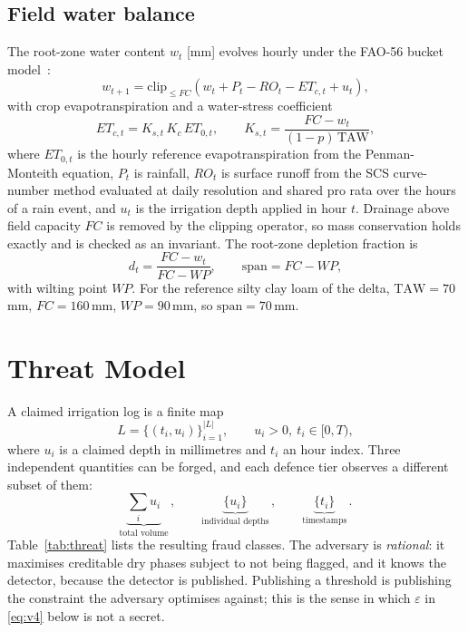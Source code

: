 \documentclass[journal]{IEEEtran}
\begin{document}
\subsection{Field water balance}

The root-zone water content $w_t$ [mm] evolves hourly under the FAO-56 bucket
model~\cite{fao56}:
\begin{equation}
w_{t+1}=\mathrm{clip}_{\le FC}\!\left(w_t+P_t-RO_t-ET_{c,t}+u_t\right),
\label{eq:bucket}
\end{equation}
with crop evapotranspiration and a water-stress coefficient
\begin{equation}
ET_{c,t}=K_{s,t}\,K_c\,ET_{0,t},
\qquad
K_{s,t}=\frac{FC-w_t}{(1-p)\,\mathrm{TAW}},
\label{eq:etc}
\end{equation}
where $ET_{0,t}$ is the hourly reference evapotranspiration from the
Penman-Monteith equation, $P_t$ is rainfall, $RO_t$ is surface runoff from the
SCS curve-number method evaluated at daily resolution and shared pro rata over
the hours of a rain event, and $u_t$ is the irrigation depth applied in hour
$t$. Drainage above field capacity $FC$ is removed by the clipping operator, so
mass conservation holds exactly and is checked as an invariant. The root-zone
depletion fraction is
\begin{equation}
d_t=\frac{FC-w_t}{FC-WP},\qquad \mathrm{span}=FC-WP,
\label{eq:depl}
\end{equation}
with wilting point $WP$. For the reference silty clay loam of the delta,
$\mathrm{TAW}=70$\,mm, $FC=160$\,mm, $WP=90$\,mm, so $\mathrm{span}=70$\,mm.

\section{Threat Model}
\label{sec:threat}

A claimed irrigation log is a finite map
\begin{equation}
L=\{(t_i,u_i)\}_{i=1}^{|L|},\qquad u_i>0,\ t_i\in[0,T),
\label{eq:log}
\end{equation}
where $u_i$ is a claimed depth in millimetres and $t_i$ an hour index. Three
independent quantities can be forged, and each defence tier observes a different
subset of them:
\begin{equation}
\underbrace{\textstyle\sum_i u_i}_{\text{total volume}}\,,\qquad
\underbrace{\{u_i\}}_{\text{individual depths}}\,,\qquad
\underbrace{\{t_i\}}_{\text{timestamps}}\,.
\label{eq:three}
\end{equation}
Table~\ref{tab:threat} lists the resulting fraud classes. The adversary is
\emph{rational}: it maximises creditable dry phases subject to not being flagged,
and it knows the detector, because the detector is published. Publishing a
threshold is publishing the constraint the adversary optimises against; this is
the sense in which $\varepsilon$ in \eqref{eq:v4} below is not a secret.
\end{document}
